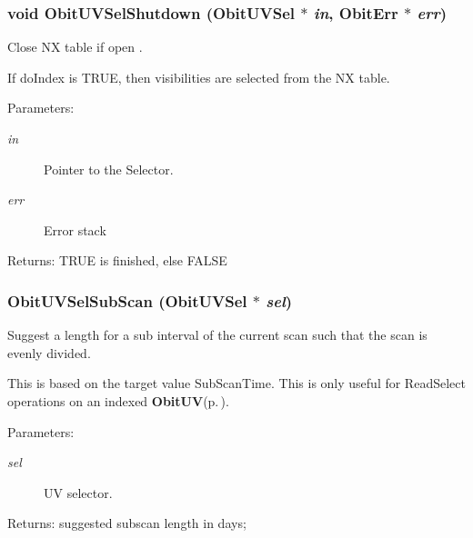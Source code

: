 \subsubsection{\setlength{\rightskip}{0pt plus 5cm}void Obit\-UVSel\-Shutdown ({\bf Obit\-UVSel} $\ast$ {\em in}, {\bf Obit\-Err} $\ast$ {\em err})}\label{ObitUVSel_8c_a16}


Close NX table if open . 

If do\-Index is TRUE, then visibilities are selected from the NX table. \begin{Desc}
\item[Parameters:]
\begin{description}
\item[{\em in}]Pointer to the Selector. \item[{\em err}]Error stack \end{description}
\end{Desc}
\begin{Desc}
\item[Returns:]TRUE is finished, else FALSE \end{Desc}
\subsubsection{ Obit\-UVSel\-Sub\-Scan ({\bf Obit\-UVSel} $\ast$ {\em sel})}\label{ObitUVSel_8c_a21}


Suggest a length for a sub interval of the current scan such that the scan is evenly divided. 

This is based on the target value Sub\-Scan\-Time. This is only useful for Read\-Select operations on an indexed {\bf Obit\-UV}{\rm (p.\,\pageref{structObitUV})}. \begin{Desc}
\item[Parameters:]
\begin{description}
\item[{\em sel}]UV selector. \end{description}
\end{Desc}
\begin{Desc}
\item[Returns:]suggested subscan length in days; \end{Desc}
